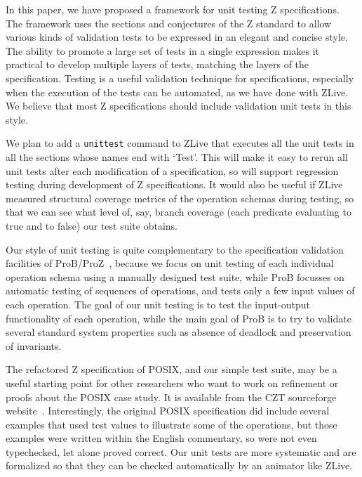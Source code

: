 \documentclass{llncs}
\begin{document}
In this paper, we have proposed a framework for unit testing Z
specifications.  The framework uses the sections and conjectures of
the Z standard to allow various kinds of validation tests to be
expressed in an elegant and concise style.  The ability to promote a
large set of tests in a single expression makes it practical to
develop multiple layers of tests, matching the layers of the
specification.  Testing is a useful validation technique for
specifications, especially when the execution of the tests can be
automated, as we have done with ZLive.  We believe that most Z
specifications should include validation unit tests in this style.

We plan to add a \texttt{unittest} command to ZLive that executes all the
unit tests in all the sections whose names end with `Test'.  This will
make it easy to rerun all unit tests after each modification of a
specification, so will support regression testing during development
of Z specifications.  It would also be useful if ZLive measured structural
coverage metrics of the operation schemas during testing, so that we
can see what level of, say, branch coverage (each predicate evaluating to
true and to false) our test suite obtains.

Our style of unit testing is quite complementary to the specification
validation facilities of ProB/ProZ~\cite{leuschel:prob08}, because we
focus on unit testing of each individual operation schema using a
manually designed test suite, while ProB focusses on automatic testing
of sequences of operations, and tests only a few input values of each
operation.  The goal of our unit testing is to test the input-output
functionality of each operation, while the main goal of ProB is to try to
validate several standard system properties such as absence of deadlock and
preservation of invariants.

The refactored Z specification of POSIX, and our simple test suite,
may be a useful starting point for other researchers who want to work
on refinement or proofs about the POSIX case study.  It is available
from the CZT sourceforge website~\cite{CZT}.  Interestingly, the
original POSIX specification did include several examples that used
test values to illustrate some of the operations, but those examples
were written within the English commentary, so were not even
typechecked, let alone proved correct.  Our unit tests are more
systematic and are formalized so that they can be checked
automatically by an animator like ZLive.


%
%


%
\end{document}
